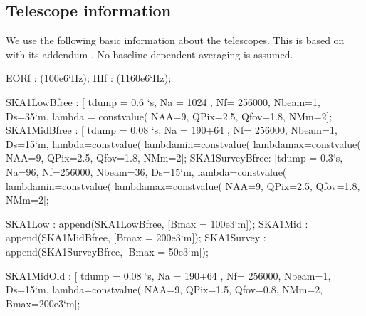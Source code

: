 \documentclass[useAMS,usenatbib,referee]{article}
\begin{document}
\subsection{Telescope information}

We use the following basic information about the telescopes. This is
based on \cite{DewdneyDD001-1} with its addendum \cite{McCoolDD003}.
No baseline dependent averaging is assumed.
\begin{maxima}[]
EORf : (100e6`Hz);
HIf : (1160e6`Hz);

SKA1LowBfree : [ tdump = 0.6 `s, Na = 1024 , Nf= 256000, Nbeam=1, Ds=35`m, 
lambda = constvalue(%
NAA=9,
QPix=2.5, Qfov=1.8,
NMm=2];
SKA1MidBfree : [ tdump = 0.08 `s, Na = 190+64 , Nf= 256000, Nbeam=1, Ds=15`m,
lambda=constvalue(%
lambdamin=constvalue(%
lambdamax=constvalue(%
NAA=9,
QPix=2.5, Qfov=1.8,
NMm=2];
SKA1SurveyBfree: [tdump = 0.3`s, Na=96, Nf=256000, Nbeam=36,      Ds=15`m,
lambda=constvalue(%
lambdamin=constvalue(%
lambdamax=constvalue(%
NAA=9,
QPix=2.5, Qfov=1.8,
NMm=2];

SKA1Low : append(SKA1LowBfree, [Bmax = 100e3`m]);
SKA1Mid : append(SKA1MidBfree, [Bmax = 200e3`m]);
SKA1Survey : append(SKA1SurveyBfree, [Bmax = 50e3`m]);

SKA1MidOld : [ tdump = 0.08 `s, Na = 190+64 , Nf= 256000, Nbeam=1, Ds=15`m, lambda=constvalue(%
NAA=9,
QPix=1.5, Qfov=0.8,
NMm=2, Bmax=200e3`m];


\end{maxima}
\end{document}

